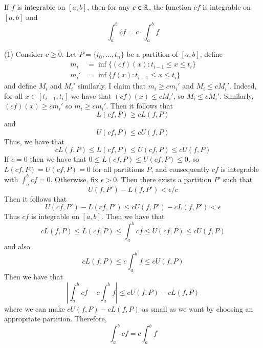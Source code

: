 \documentclass[12pt]{report}
\begin{document}
\begin{thm}{}{}
    If $f$ is integrable on $[a,b]$, then for any $c \in \mathbb R$, the function $cf$ is integrable on $[a,b]$ and \begin{equation}
        \int_a^bcf = c\cdot\int_a^bf
    \end{equation}
\end{thm}
\begin{proof*}{}{}
    (1) Consider $c \geq 0$. Let $P = \{t_0,...,t_n\}$ be a partition of $[a,b]$, define \begin{align*}
        m_i &= \inf\{(cf)(x):t_{i-1} \leq x \leq t_i\} \\
        m_i' &= \inf\{f(x):t_{i-1} \leq x \leq t_i\} 
    \end{align*}
    and define $M_i$ and $M_i'$ similarly. I claim that $m_i \geq cm_i'$ and $M_i \leq cM_i'$. Indeed, for all $x \in [t_{i-1},t_i]$ we have that $(cf)(x) \leq cM_i'$, so $M_i \leq cM_i'$. Similarly, $(cf)(x) \geq cm_i'$ so $m_i \geq cm_i'$. Then it follows that $$L(cf,P) \geq cL(f,P)$$ and $$U(cf,P) \leq cU(f,P)$$
    Thus, we have that $$cL(f,P) \leq L(cf,P) \leq U(cf,P) \leq cU(f,P)$$
    If $c = 0$ then we have that $0 \leq L(cf,P) \leq U(cf,P) \leq 0$, so $L(cf,P) = U(cf,P) = 0$ for all partitions $P$, and consequently $cf$ is integrable with $\int_a^bcf = 0$. Otherwise, fix $\epsilon > 0$. Then there exists a partition $P'$ such that $$U(f,P') - L(f,P') < \epsilon/c$$
    Then it follows that \begin{equation*}
        U(cf,P') - L(cf,P') \leq cU(f,P') - cL(f,P') < \epsilon
    \end{equation*}
    Thus $cf$ is integrable on $[a,b]$. Then we have that \begin{equation*}
        cL(f,P) \leq L(cf,P) \leq \int_a^bcf \leq U(cf,P) \leq cU(f,P)
    \end{equation*}
    and also \begin{equation*}
        cL(f,P) \leq c\int_a^bf\leq cU(f,P)
    \end{equation*}
    Then we have that \begin{equation*}
        \left|\int_a^bcf - c\int_a^bf\right| \leq cU(f,P) - cL(f,P) 
    \end{equation*}
    where we can make $cU(f,P) - cL(f,P)$ as small as we want by choosing an appropriate partition. Therefore, \begin{equation*}
        \int_a^bcf = c\int_a^bf
    \end{equation*}



\end{proof*}
\end{document}

